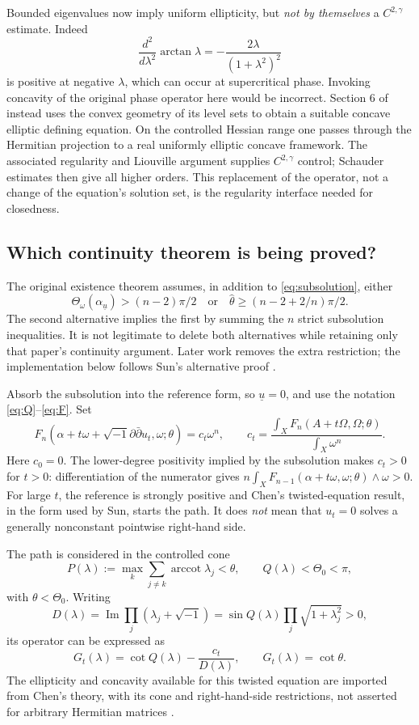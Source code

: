 \documentclass[12pt,reqno]{amsart}
\newcommand{\ii}{\sqrt{-1}}
\newcommand{\ddc}{\ii\partial\bar\partial}
\newcommand{\Th}{\Theta_\omega}
\newcommand{\hth}{\widehat\theta}
\newcommand{\arccot}{\operatorname{arccot}}
\newcommand{\Imm}{\operatorname{Im}}
\begin{document}
Bounded eigenvalues now imply uniform ellipticity, but \emph{not by themselves} a $C^{2,\gamma}$ estimate. Indeed
\[
 \frac{d^2}{d\lambda^2}\arctan\lambda
       =-\frac{2\lambda}{(1+\lambda^2)^2}
\]
is positive at negative $\lambda$, which can occur at supercritical phase. Invoking concavity of the original phase operator here would be incorrect. Section 6 of \cite{CJY} instead uses the convex geometry of its level sets to obtain a suitable concave elliptic defining equation. On the controlled Hessian range one passes through the Hermitian projection to a real uniformly elliptic concave framework. The associated regularity and Liouville argument supplies $C^{2,\gamma}$ control; Schauder estimates then give all higher orders. This replacement of the operator, not a change of the equation's solution set, is the regularity interface needed for closedness.

\subsection{Which continuity theorem is being proved?}
The original existence theorem \cite[Theorem 1.2]{CJY} assumes, in addition to \eqref{eq:subsolution}, either
\[
 \Th(\alpha_{\underline u})>(n-2)\pi/2
 \quad\text{or}\quad
 \hth\geq(n-2+2/n)\pi/2.
\]
The second alternative implies the first by summing the $n$ strict subsolution inequalities. It is not legitimate to delete both alternatives while retaining only that paper's continuity argument. Later work removes the extra restriction; the implementation below follows Sun's alternative proof \cite[Proposition 4.1]{Sun}. 

Absorb the subsolution into the reference form, so $\underline u=0$, and use the notation \eqref{eq:Q}--\eqref{eq:F}. Set
\begin{equation}\label{eq:twisted}
 F_n(\alpha+t\omega+\ddc u_t,\omega;\theta)=c_t\omega^n,
 \qquad
 c_t=\frac{\int_X F_n(A+t\Omega,\Omega;\theta)}{\int_X\omega^n}.
\end{equation}
Here $c_0=0$. The lower-degree positivity implied by the subsolution makes $c_t>0$ for $t>0$: differentiation of the numerator gives $n\int_X F_{n-1}(\alpha+t\omega,\omega;\theta)\wedge\omega>0$. For large $t$, the reference is strongly positive and Chen's twisted-equation result, in the form used by Sun, starts the path. It does \emph{not} mean that $u_t=0$ solves a generally nonconstant pointwise right-hand side.

The path is considered in the controlled cone
\[
 P(\lambda):=\max_k\sum_{j\ne k}\arccot\lambda_j<\theta,
 \qquad Q(\lambda)<\Theta_0<\pi,
\]
with $\theta<\Theta_0$. Writing
\[
 D(\lambda)=\Imm\prod_j(\lambda_j+\ii)
            =\sin Q(\lambda)\prod_j\sqrt{1+\lambda_j^2}>0,
\]
its operator can be expressed as
\begin{equation}\label{eq:twisted-operator}
 G_t(\lambda)=\cot Q(\lambda)-\frac{c_t}{D(\lambda)},
 \qquad G_t(\lambda)=\cot\theta.
\end{equation}
The ellipticity and concavity available for this twisted equation are imported from Chen's theory, with its cone and right-hand-side restrictions, not asserted for arbitrary Hermitian matrices \cite[Proposition 2.8]{CLT}.
\end{document}
